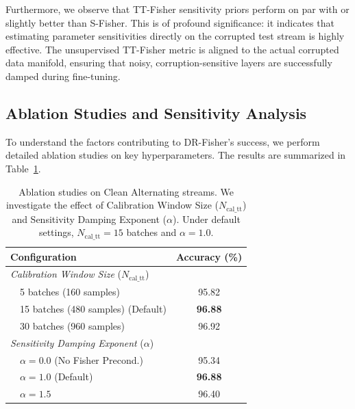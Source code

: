\documentclass{article}
\theoremstyle{plain}
\theoremstyle{definition}
\theoremstyle{remark}
\begin{document}
Furthermore, we observe that TT-Fisher sensitivity priors perform on par with or slightly better than S-Fisher. This is of profound significance: it indicates that estimating parameter sensitivities directly on the corrupted test stream is highly effective. The unsupervised TT-Fisher metric is aligned to the actual corrupted data manifold, ensuring that noisy, corruption-sensitive layers are successfully damped during fine-tuning.

\subsection{Ablation Studies and Sensitivity Analysis}
To understand the factors contributing to DR-Fisher's success, we perform detailed ablation studies on key hyperparameters. The results are summarized in Table~\ref{tab:ablation_results}.

\begin{table}[h]
\caption{Ablation studies on Clean Alternating streams. We investigate the effect of Calibration Window Size ($N_{\text{cal\_tt}}$) and Sensitivity Damping Exponent ($\alpha$). Under default settings, $N_{\text{cal\_tt}} = 15$ batches and $\alpha = 1.0$.}
\label{tab:ablation_results}
\vskip 0.15in
\begin{center}
\begin{small}
\begin{sc}
\begin{tabular}{lc}
\toprule
Configuration & Accuracy (\%) \\
\midrule
\textit{Calibration Window Size} ($N_{\text{cal\_tt}}$) & \\
~~5 batches (160 samples) & 95.82 \\
~~15 batches (480 samples) (Default) & \textbf{96.88} \\
~~30 batches (960 samples) & 96.92 \\
\midrule
\textit{Sensitivity Damping Exponent} ($\alpha$) & \\
~~$\alpha = 0.0$ (No Fisher Precond.) & 95.34 \\
~~$\alpha = 1.0$ (Default) & \textbf{96.88} \\
~~$\alpha = 1.5$ & 96.40 \\
\bottomrule
\end{tabular}
\end{sc}
\end{small}
\end{center}
\vskip -0.1in
\end{table}
\end{document}
